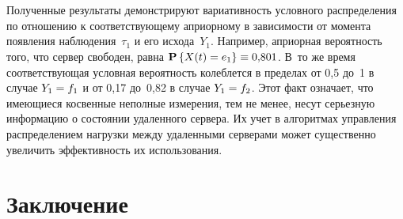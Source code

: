 \begin{multicols}{2}
\begin{figure*} %
\vspace*{1pt}
\begin{center}
\mbox{%
\epsfxsize=105mm
}
\end{center}
\vspace*{-9pt}
\label{pic1}
\end{figure*}
\begin{figure*} %
\vspace*{1pt}
\begin{center}
\mbox{%
\epsfxsize=104mm
}
\end{center}
\vspace*{-9pt}
 \label{pic4}
\end{figure*}


Полученные результаты демонстрируют вариативность условного распределения
по отношению к соответствующему априорному в зависимости от момента появления
наблюдения~$\tau_1$ и его исхода~$Y_1$. Например, априорная вероятность того,
что сервер свободен, равна $\pp{X(t)\hm=e_1} \hm\equiv 0{,}801$. В~то же время
соответствующая условная вероятность колеблется в пределах от 0,5 до~1
в случае $Y_1\hm=f_1$ и от 0,17 до~0,82 в случае $Y_1\hm=f_2$. Этот факт
означает, что имеющиеся косвенные неполные измерения, тем не менее, несут
серьезную информацию о состоянии удаленного сервера. Их учет в алгоритмах
управления распределением нагрузки между удаленными серверами может существенно
увеличить эффективность их использования.

  \section{Заключение}


\end{multicols}
